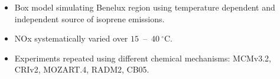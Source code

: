 \begin{BlueBox}
    \vskip-1cm
    \begin{block}{}
        \begin{itemize} 
            \item Box model simulating Benelux region using temperature dependent and independent source of isoprene emissions. \vspace{8mm}
            \item NOx systematically varied over \mbox{$15$ -- $40~^{\circ}$C}. \vspace{8mm}
            \item Experiments repeated using different chemical mechanisms: MCMv3.2, CRIv2, MOZART.4, RADM2, CB05. \vspace{8mm}
        \end{itemize}
    \end{block}
\end{BlueBox}
